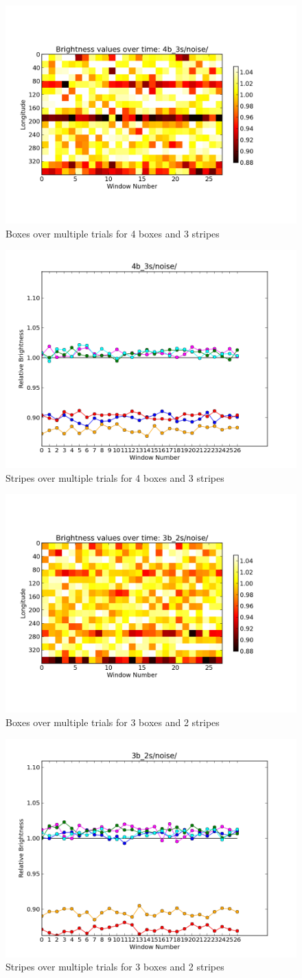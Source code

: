 \documentclass[iop]{emulateapj}
\begin{document}
\begin{figure}[h]
	\centering
	\includegraphics[width=.5\textwidth]{images/4b_3s/noise/region_plot.png}
	\caption{Boxes over multiple trials for 4 boxes and 3 stripes}
	\label{4b_3s/noise}
\end{figure}
\begin{figure}[h]
	\centering
	\includegraphics[width=.5\textwidth]{images/4b_3s/noise/stripes_over_time.png}
	\caption{Stripes over multiple trials for 4 boxes and 3 stripes}
	\label{4b_3s/noise/stripes}
\end{figure}

\begin{figure}[h]
	\centering
	\includegraphics[width=.5\textwidth]{images/3b_2s/noise/region_plot.png}
	\caption{Boxes over multiple trials for 3 boxes and 2 stripes}
	\label{3b_2s/noise}
\end{figure}
\begin{figure}[h]
	\centering
	\includegraphics[width=.5\textwidth]{images/3b_2s/noise/stripes_over_time.png}
	\caption{Stripes over multiple trials for 3 boxes and 2 stripes}
	\label{3b_2s/noise/stripes}
\end{figure}
\end{document}
